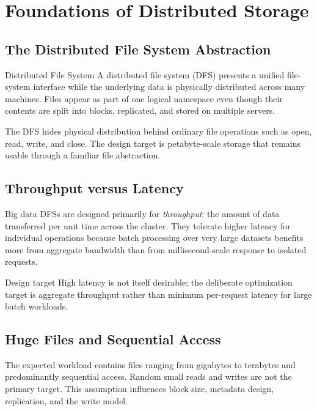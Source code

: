 \documentclass[11pt,a4paper,oneside]{book}
\begin{document}
\section{Foundations of Distributed Storage}

\subsection{The Distributed File System Abstraction}

\begin{definitionbox}{Distributed File System}
A distributed file system (DFS) presents a unified file-system interface while the underlying data is physically distributed across many machines. Files appear as part of one logical namespace even though their contents are split into blocks, replicated, and stored on multiple servers.
\end{definitionbox}

The DFS hides physical distribution behind ordinary file operations such as open, read, write, and close. The design target is petabyte-scale storage that remains usable through a familiar file abstraction.

\subsection{Throughput versus Latency}

Big data DFSs are designed primarily for \emph{throughput}: the amount of data transferred per unit time across the cluster. They tolerate higher latency for individual operations because batch processing over very large datasets benefits more from aggregate bandwidth than from millisecond-scale response to isolated requests.

\begin{remarkbox}{Design target}
High latency is not itself desirable; the deliberate optimization target is aggregate throughput rather than minimum per-request latency for large batch workloads.
\end{remarkbox}

\subsection{Huge Files and Sequential Access}

The expected workload contains files ranging from gigabytes to terabytes and predominantly sequential access. Random small reads and writes are not the primary target. This assumption influences block size, metadata design, replication, and the write model.
\end{document}
